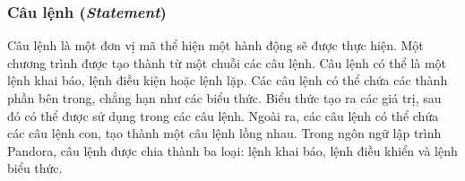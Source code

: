 \subsubsection{Câu lệnh (\textit{Statement})}

\regexstmt

Câu lệnh là một đơn vị mã thể hiện một hành động sẽ được thực hiện. Một chương trình được tạo thành từ một chuỗi các câu lệnh. Câu lệnh có thể là một lệnh khai báo, lệnh điều kiện hoặc lệnh lặp. Các câu lệnh có thể chứa các thành phần bên trong, chẳng hạn như các biểu thức. Biểu thức tạo ra các giá trị, sau đó có thể được sử dụng trong các câu lệnh. Ngoài ra, các câu lệnh có thể chứa các câu lệnh con, tạo thành một câu lệnh lồng nhau. Trong ngôn ngữ lập trình Pandora, câu lệnh được chia thành ba loại: lệnh khai báo, lệnh điều khiển và lệnh biểu thức.


